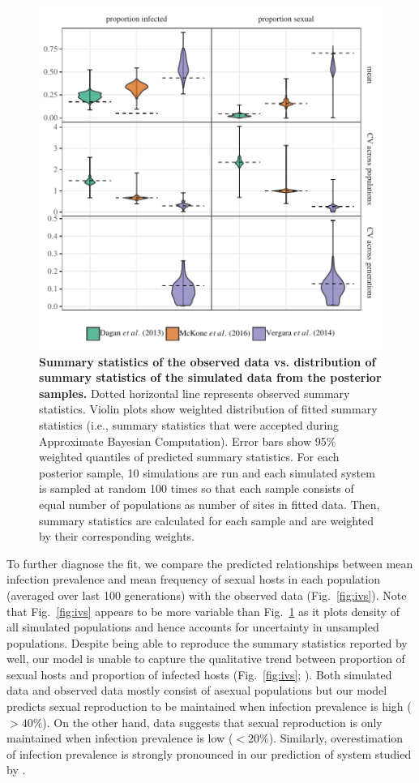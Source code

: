 \documentclass{article}\usepackage[]{graphicx}\usepackage[]{color}
\newcommand{\fref}[1]{Fig.~\ref{fig:#1}}
\begin{document}
\begin{figure}[!ht]
\includegraphics[width=\textwidth]{../fig/smc_summary.pdf}
\caption{{\bf Summary statistics of the observed data vs. distribution of summary statistics of the simulated data from the posterior samples.}
Dotted horizontal line represents observed summary statistics.
Violin plots show weighted distribution of fitted summary statistics (i.e., summary statistics that were accepted during Approximate Bayesian Computation). 
Error bars show 95\% weighted quantiles of predicted summary statistics.
For each posterior sample, 10 simulations are run and each simulated system is sampled at random 100 times so that each sample consists of equal number of populations as number of sites in fitted data. 
Then, summary statistics are calculated for each sample and are weighted by their corresponding weights.
}
\label{fig:smcsumm}
\end{figure}

To further diagnose the fit, we compare the predicted relationships between mean infection prevalence and mean frequency of sexual hosts in each population (averaged over last 100 generations) with the observed data (\fref{ivs}).
Note that \fref{ivs} appears to be more variable than \fref{smcsumm} as it plots density of all simulated populations and hence accounts for uncertainty in unsampled populations.
Despite being able to reproduce the summary statistics reported by \cite{dagan2013clonal} well, 
our model is unable to capture the qualitative trend between proportion of sexual hosts and proportion of infected hosts (\fref{ivs}; \cite{dagan2013clonal}).
Both simulated data and observed data mostly consist of asexual populations
but our model predicts sexual reproduction to be maintained when infection prevalence is high ($> 40\%$). 
On the other hand, \cite{dagan2013clonal} data suggests that sexual reproduction is only maintained when infection prevalence is low ($< 20\%$).
Similarly, overestimation of infection prevalence is strongly pronounced in our prediction of system studied by \cite{mckone2016fine}.
\end{document}
